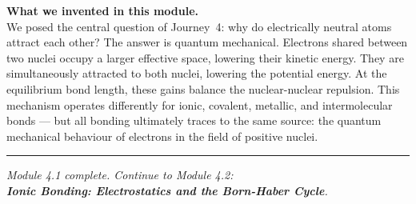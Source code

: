 \documentclass[12pt, a4paper]{book}
\begin{document}
\vspace{1.5em}
\begin{center}
\begin{tcolorbox}[enhanced, colback=DiscoveryColor!8, colframe=DiscoveryColor,
  width=0.88\textwidth, arc=3pt]
\centering\sffamily\small
\textbf{What we invented in this module.}\\[4pt]
We posed the central question of Journey~4: why do
electrically neutral atoms attract each other?
The answer is quantum mechanical.
Electrons shared between two nuclei occupy a larger
effective space, lowering their kinetic energy.
They are simultaneously attracted to both nuclei,
lowering the potential energy.
At the equilibrium bond length, these gains balance
the nuclear-nuclear repulsion.
This mechanism operates differently for ionic, covalent,
metallic, and intermolecular bonds ---
but all bonding ultimately traces to the same source:
the quantum mechanical behaviour of electrons in the
field of positive nuclei.
\end{tcolorbox}
\end{center}

\vspace{2em}
\noindent\textcolor{JourneyColor!40}{\rule{\textwidth}{0.6pt}}
\begin{center}
\textit{\sffamily\small
Module 4.1 complete. Continue to Module 4.2:\\
\textbf{Ionic Bonding: Electrostatics and the Born-Haber Cycle}.}
\end{center}
\end{document}

